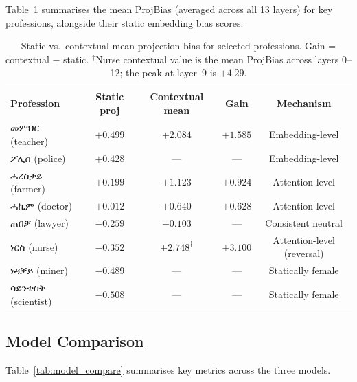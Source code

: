\documentclass[11pt,a4paper]{article}
\begin{document}
Table~\ref{tab:prof_bias} summarises the mean ProjBias (averaged across all 13
layers) for key professions, alongside their static embedding bias scores.

\begin{table}[h]
\centering
\small
\begin{tabular}{lcccc}
\toprule
\textbf{Profession} & \textbf{Static proj} & \textbf{Contextual mean} & \textbf{Gain} & \textbf{Mechanism} \\
\midrule
{\ethiopicfont መምህር} (teacher)   & $+0.499$ & $+2.084$ & $+1.585$ & Embedding-level \\
{\ethiopicfont ፖሊስ}  (police)    & $+0.428$ & ---      & ---      & Embedding-level \\
{\ethiopicfont ሓረስታይ} (farmer)  & $+0.199$ & $+1.123$ & $+0.924$ & Attention-level \\
{\ethiopicfont ሓኪም}  (doctor)   & $+0.012$ & $+0.640$ & $+0.628$ & Attention-level \\
{\ethiopicfont ጠበቓ}  (lawyer)   & $-0.259$ & $-0.103$ & ---      & Consistent neutral \\
{\ethiopicfont ነርስ}   (nurse)    & $-0.352$ & $+2.748^\dagger$ & $+3.100$ & Attention-level (reversal) \\
{\ethiopicfont ነዳቓይ} (miner)    & $-0.489$ & ---       & ---      & Statically female \\
{\ethiopicfont ሳይንቲስት} (scientist) & $-0.508$ & ---    & ---      & Statically female \\
\bottomrule
\end{tabular}
\caption{Static vs.\ contextual mean projection bias for selected professions.
Gain = contextual $-$ static. $^\dagger$Nurse contextual value is the mean
ProjBias across layers 0--12; the peak at layer~9 is $+4.29$.}
\label{tab:prof_bias}
\end{table}

\subsection{Model Comparison}

Table~\ref{tab:model_compare} summarises key metrics across the three models.
\end{document}
